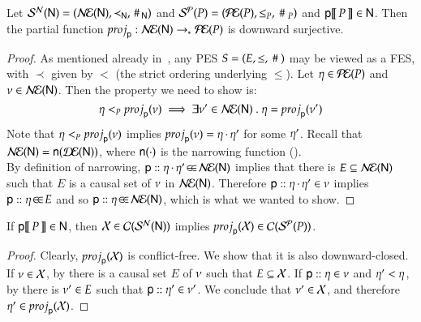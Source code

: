 \begin{lemma}
\label{prop:down-onto1}
Let $\mathcal{S}^{\mathcal{N}}({\sf N}) = (\mathcal{N\!E}({\sf N}), \prec_{{\sf N}} , \,\#\,_{{\sf N}})$ and $\mathcal{S^P}(P) =
(\mathcal{P\!E}(P), \leq_{P} , ~\#~_{P})$ and ${\sf p}[\![\,P\,]\!]\in{\sf N}$. Then the
partial function ${\sc proj}_{{\sf p}}:\mathcal{N\!E}({\sf N}) \rightarrow_* \mathcal{P\!E}(P)$ is
downward surjective.
\end{lemma}
\begin{proof}
  As mentioned already in~, any PES $S =
  (E, \leq, ~\#~)$ may be viewed as a FES, with $\prec$ given by $<$
  (the strict ordering underlying $\leq$). Let $\eta \in \mathcal{P\!E}(P)$
  and $\nu \in \mathcal{N\!E}({\sf N})$.  Then the property we need to show is:
\[\eta <_{P} {\sc proj}_{{\sf p}}(\nu) \implies \exists \nu' \in
\mathcal{N\!E}({\sf N})~.~\eta = {\sc proj}_{{\sf p}}(\nu') \] Note that $\eta
<_{P} {\sc proj}_{{\sf p}}(\nu)$ implies ${\sc proj}_{{\sf p}}(\nu) =
\eta\,{\cdot}\,\eta'$ for some $\eta'$. Recall that $\mathcal{N\!E}({\sf N})
= {\sf n}(\mathcal{D\!E}({\sf N}))$, where ${\sf n}(\cdot)$ is the narrowing function
().\\  By definition of narrowing,
${\sf p}:: \eta\,{\cdot}\,\eta'\!\in\!\in\!\mathcal{N\!E}({\sf N})$ implies 
that there is $E\subseteq\mathcal{N\!E}({\sf N})$ such that $E$ is a causal set of
$\nu$ in $\mathcal{N\!E}({\sf N})$.  Therefore
${\sf p}:: \eta\,{\cdot}\,\eta'\in\nu$
implies ${\sf p}:: \eta\!\in\!\in\!E$ and so
${\sf p}:: \eta\!\in\!\in\!\mathcal{N\!E}({\sf N})$, which is what we wanted to show.
\end{proof}

\begin{theorem}
  If ${\sf p}[\![\,P\,]\!]\in{\sf N}$, then $\mathcal{X} \in \mathcal{C}(\mathcal{S}^{\mathcal{N}}({\sf N}))$ implies
  ${\sc proj}_{{\sf p}}(\mathcal{X}) \in \mathcal{C}(\mathcal{S^P}(P))$.
\end{theorem}

\begin{proof}  Clearly, ${\sc proj}_{{\sf p}}(\mathcal{X})$ is
  conflict-free. We show that it is also downward-closed. 
 If $\nu\in\mathcal{X}$, by  there is a
  causal set $E$ of $\nu$ such that $E \subseteq\mathcal{X}$. If
  ${\sf p}:: \eta\in\nu$ and $\eta'<\eta$, by 
  there is $\nu'\in E$ such that
  ${\sf p}:: \eta'\in\nu'$. We conclude that $\nu'\in\mathcal{X}$,
   and therefore $\eta' \in {\sc proj}_{{\sf p}}(\mathcal{X})$. 
\end{proof}


